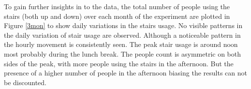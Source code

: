\documentclass[../UNBThesis2.tex]{subfiles}
\begin{document}
To gain further insights in to the data, the total number of people using the stairs (both up and down) over each month of the experiment are plotted in Figure \ref{3mon} to show daily variations in the stairs usage. No visible patterns in the daily variation of stair usage are observed.  Although a noticeable pattern in the hourly movement is consistently seen. The peak stair usage is around noon most probably during the lunch break. The people count is asymmetric on both sides of the peak, with more people using the stairs in the afternoon. But the presence of a higher number of people in the afternoon biasing the results can not be discounted. %


\end{document}
